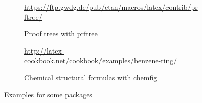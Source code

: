 \begin{figure}[p]
{\begin{subfigure}{\widefigurewidth}
		\end{subfigure}
		\colrules
		\begin{subfigure}[t]{\widefigurewidth}
			\caption{Proof trees with prftree}
			\centering\tiny{\url{https://ftp.gwdg.de/pub/ctan/macros/latex/contrib/prftree/}}
			\label{fig:prftree-example}
		\end{subfigure}
		\hspace{\widefiguregap}
		\begin{subfigure}[t]{\widefigurewidth}
			\caption{Chemical structural formulas with chemfig}
			\centering\tiny{\url{http://latex-cookbook.net/cookbook/examples/benzene-ring/}}
			\label{fig:chemfig-example}
		\end{subfigure}
		\medskip
	}
	\caption{Examples for some packages}
	\label{fig:package-examples}
\end{figure}


